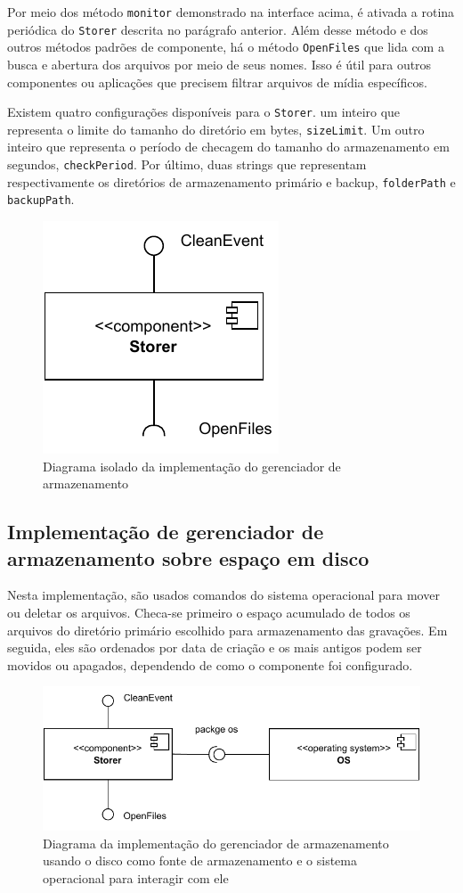 \documentclass[12pt, %
openright, 
oneside, %
a4paper,    %
brazil]{facom-ufu-abntex2}
\begin{document}
Por meio dos método \texttt{monitor} demonstrado na interface acima, é ativada
a rotina periódica do \texttt{Storer} descrita no parágrafo anterior. Além
desse método e dos outros métodos padrões de componente, há o método
\texttt{OpenFiles} que lida com a busca e abertura dos arquivos por
meio de seus nomes. Isso é útil para outros componentes ou aplicações que
precisem filtrar arquivos de mídia específicos.

Existem quatro configurações disponíveis para o \texttt{Storer}. um inteiro que
representa o limite do tamanho do diretório em bytes, \texttt{sizeLimit}. Um
outro inteiro que representa o período de checagem do tamanho do armazenamento
em segundos, \texttt{checkPeriod}. Por último, duas strings que representam
respectivamente os diretórios de armazenamento primário e backup,
\texttt{folderPath} e \texttt{backupPath}.

\begin{figure}[!ht]
	\centering
	\includegraphics[width=0.3\linewidth]{storer.pdf}
	\caption[Diagrama isolado da implementação do gerenciador de
		armazenamento]{Diagrama isolado da implementação do gerenciador de
		armazenamento
	}
	\label{fig:graficosVariandoTamanhoRede}
\end{figure}

\subsection{Implementação de gerenciador de armazenamento sobre espaço em
	disco}
Nesta implementação, são usados comandos do sistema operacional para mover ou
deletar os arquivos. Checa-se primeiro o espaço acumulado de todos os arquivos
do diretório primário escolhido para armazenamento das gravações. Em seguida,
eles são ordenados por data de criação e os mais antigos podem ser movidos ou
apagados, dependendo de como o componente foi configurado.

\begin{figure}[!ht]
	\centering
	\includegraphics[width=0.8\linewidth]{storer_os.pdf}
	\caption[Diagrama da implementação do gerenciador de armazenamento
		usando o sistema operacional]{Diagrama da implementação do gerenciador de
		armazenamento usando o disco como fonte de armazenamento e o sistema
		operacional para interagir com ele}
	\label{fig:graficosVariandoTamanhoRede}
\end{figure}
\end{document}
